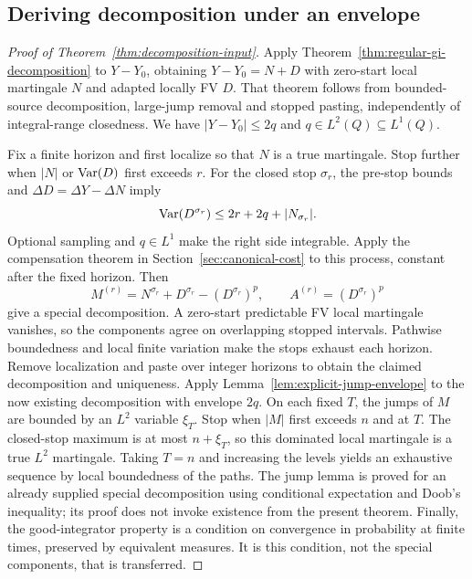 \subsection{Deriving decomposition under an envelope}
\label{sec:interface-decomposition}
\begin{proof}[Proof of Theorem~\ref{thm:decomposition-input}]
Apply Theorem~\ref{thm:regular-gi-decomposition} to $Y-Y_0$, obtaining
$Y-Y_0=N+D$ with zero-start local martingale $N$ and adapted locally FV $D$.
That theorem follows from bounded-source decomposition, large-jump removal
and stopped pasting, independently of integral-range closedness.
We have $|Y-Y_0|\leq2q$ and $q\in L^2(Q)\subseteq L^1(Q)$.

Fix a finite horizon and first localize so that $N$ is a true martingale.
Stop further when $|N|$ or $\operatorname{Var}(D)$ first exceeds $r$.
For the closed stop $\sigma_r$, the pre-stop bounds and
$\Delta D=\Delta Y-\Delta N$ imply
\[
 \operatorname{Var}(D^{\sigma_r})\leq2r+2q+|N_{\sigma_r}|.
\]
Optional sampling and $q\in L^1$ make the right side integrable.
Apply the compensation theorem in Section~\ref{sec:canonical-cost} to this
process, constant after the fixed horizon. Then
\[
 M^{(r)}=N^{\sigma_r}+D^{\sigma_r}-(D^{\sigma_r})^p,
 \qquad A^{(r)}=(D^{\sigma_r})^p
\]
give a special decomposition. A zero-start predictable FV local martingale
vanishes, so the components agree on overlapping stopped intervals.
Pathwise boundedness and local finite variation make the stops exhaust each
horizon. Remove localization and paste over integer horizons to obtain the
claimed decomposition and uniqueness. Apply Lemma~\ref{lem:explicit-jump-envelope} to the now existing decomposition with envelope $2q$.
On each fixed $T$, the jumps of $M$ are bounded by an $L^2$ variable $\xi_T$.
Stop when $|M|$ first exceeds $n$ and at $T$. The closed-stop maximum is
at most $n+\xi_T$, so this dominated local martingale is a true $L^2$
martingale. Taking $T=n$ and increasing the levels yields an exhaustive
sequence by local boundedness of the paths. The jump lemma is proved for
an already supplied special decomposition using conditional expectation
and Doob's inequality; its proof does not invoke existence from the present theorem.
Finally, the good-integrator property is a condition on convergence in
probability at finite times, preserved by equivalent measures. It is this condition, not the special components, that
is transferred.
\end{proof}
